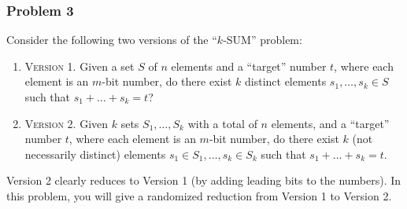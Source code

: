 \documentclass{article}
\begin{document}


\subsubsection{Problem 3}
Consider the following two versions of the ``\(k\)-SUM'' problem:

\begin{enumerate}
    \item \textsc{Version 1.} Given a set \(S\) of \(n\) elements and a ``target'' number \(t\), where each element is an \(m\)-bit number, do there exist \(k\) distinct elements \(s_1, \dots, s_k \in S\) such that \(s_1 + \dots + s_k = t\)?
    
    \item \textsc{Version 2.} Given \(k\) sets \(S_1, \dots, S_k\) with a total of \(n\) elements, and a ``target'' number \(t\), where each element is an \(m\)-bit number, do there exist \(k\) (not necessarily distinct) elements \(s_1 \in S_1, \dots, s_k \in S_k\) such that \(s_1 + \dots + s_k = t\).
\end{enumerate}

Version 2 clearly reduces to Version 1 (by adding leading bits to the numbers). In this problem, you will give a randomized reduction from Version 1 to Version 2.
\end{document}
